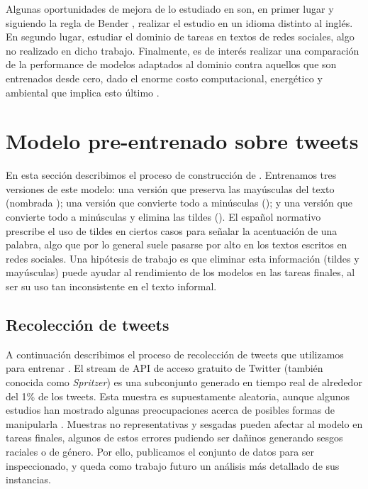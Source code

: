 Algunas oportunidades de mejora de lo estudiado en \citet{gururangan-etal-2020-dont} son, en primer lugar y siguiendo la regla de Bender \cite{bender2011achieving}, realizar el estudio en un idioma distinto al inglés. En segundo lugar, estudiar el dominio de tareas en textos de redes sociales, algo no realizado en dicho trabajo. Finalmente, es de interés realizar una comparación de la performance de modelos adaptados al dominio contra aquellos que son entrenados desde cero, dado el enorme costo computacional, energético y ambiental que implica esto último \cite{strubell2019energy}.



\section{Modelo pre-entrenado sobre tweets}
\label{sec:robertuito_pretrained}

En esta sección describimos el proceso de construcción de \robertuito{}. Entrenamos tres versiones de este modelo: una versión que preserva las mayúsculas del texto (nombrada ); una versión que convierte todo a minúsculas (); y una versión que convierte todo a minúsculas y elimina las tildes (). El español normativo prescribe el uso de tildes en ciertos casos para señalar la acentuación de una palabra, algo que por lo general suele pasarse por alto en los textos escritos en redes sociales. Una hipótesis de trabajo es que eliminar esta información (tildes y mayúsculas) puede ayudar al rendimiento de los modelos en las tareas finales, al ser su uso tan inconsistente en el texto informal.


\subsection{Recolección de tweets}

\label{sec:robertuito_data_collection}

A continuación describimos el proceso de recolección de tweets que utilizamos para entrenar \robertuito{}. El stream de API de acceso gratuito de Twitter (también conocida como \emph{Spritzer}) es una subconjunto generado en tiempo real de alrededor del 1\% de los tweets. Esta muestra es supuestamente aleatoria, aunque algunos estudios han mostrado algunas preocupaciones acerca de posibles formas de manipularla \cite{pfeffer2018tampering}. Muestras no representativas y sesgadas pueden afectar al modelo en tareas finales, algunos de estos errores pudiendo ser dañinos generando sesgos raciales o de género. Por ello, publicamos el conjunto de datos para ser inspeccionado, y queda como trabajo futuro un análisis más detallado de sus instancias.

